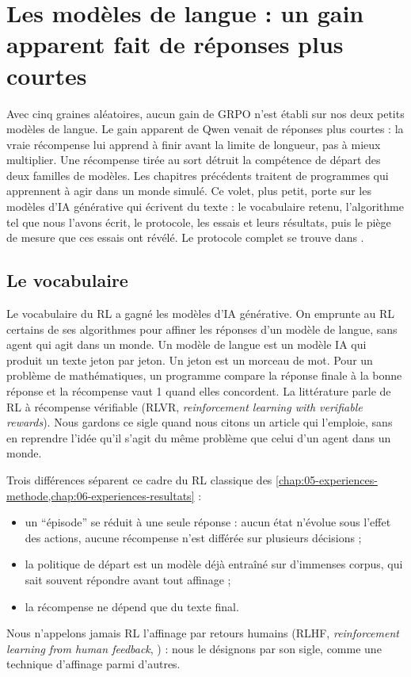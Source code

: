 \chapter{Les modèles de langue : un gain apparent fait de réponses plus courtes}
\label{chap:07-modeles-de-langue}

Avec cinq graines aléatoires, aucun gain de GRPO n'est établi sur nos deux petits modèles de langue. Le gain
apparent de Qwen venait de réponses plus courtes : la vraie récompense lui apprend à finir avant la limite
de longueur, pas à mieux multiplier. Une récompense tirée au sort détruit la compétence de départ des deux
familles de modèles. Les chapitres précédents traitent de programmes qui apprennent à agir dans un monde
simulé. Ce volet, plus petit, porte sur les modèles d'IA générative qui écrivent du texte : le vocabulaire
retenu, l'algorithme tel que nous l'avons écrit, le protocole, les essais et leurs résultats, puis le piège
de mesure que ces essais ont révélé. Le protocole complet se trouve dans .

\section{Le vocabulaire}
\label{sec:llm-vocabulaire}

Le vocabulaire du RL a gagné les modèles d'IA générative. On emprunte au RL certains de ses
algorithmes pour affiner les réponses d'un modèle de langue, sans agent qui agit dans un monde. Un modèle de langue est un modèle IA qui produit un texte jeton par
jeton. Un jeton est un morceau de mot. Pour un problème de mathématiques, un programme compare la
réponse finale à la bonne réponse et la récompense vaut 1 quand elles concordent. La littérature
parle de RL à récompense vérifiable (RLVR, \emph{reinforcement learning with verifiable rewards}).
Nous gardons ce sigle quand nous citons un article qui l'emploie, sans en reprendre l'idée qu'il
s'agit du même problème que celui d'un agent dans un monde.

Trois différences séparent ce cadre du RL classique des \cref{chap:05-experiences-methode,chap:06-experiences-resultats} :
\begin{itemize}
  \item un \enquote{épisode} se réduit à une seule réponse : aucun état n'évolue sous l'effet des
        actions, aucune récompense n'est différée sur plusieurs décisions ;
  \item la politique de départ est un modèle déjà entraîné sur d'immenses corpus, qui sait souvent
        répondre avant tout affinage ;
  \item la récompense ne dépend que du texte final.
\end{itemize}
Nous n'appelons jamais RL l'affinage par retours humains (RLHF,
\emph{reinforcement learning from human feedback}, \cite{ouyang2022instructgpt}) : nous le
désignons par son sigle, comme une technique d'affinage parmi d'autres.

